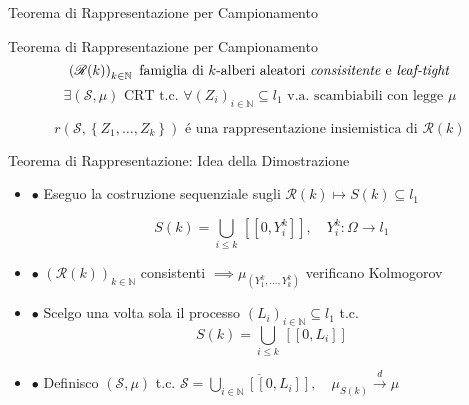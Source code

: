 \documentclass{beamer}
\theoremstyle{definition}
\theoremstyle{plain}
\theoremstyle{remark}
\begin{document}
\begin{frame}{Teorema di Rappresentazione per Campionamento}

\begin{block}{Teorema di Rappresentazione per Campionamento}
\vspace{.15cm}
$$\left(\mathscr{R}(k)\right)_{k\in\mathbb{N}}\text{ famiglia di $k$-alberi aleatori \textit{consisitente} e \textit{leaf-tight}}$$
$$\exists \left(\mathscr{S}, \mu\right)\text{ CRT t.c. }\forall \left(Z_i\right)_{i\in\mathbb{N}}\subseteq l_1 \text{  v.a. scambiabili con legge }\mu$$

$$r\left(\mathscr{S}, \left\{Z_1, \dots ,Z_k\right\}\right) \text{ \'e una rappresentazione insiemistica di } \mathscr{R}(k)$$
\vspace{.3cm}
\end{block}
\end{frame}


\begin{frame}{Teorema di Rappresentazione: Idea della Dimostrazione}
\begin{itemize}
\item $\bullet$ Eseguo la costruzione sequenziale sugli $\mathscr{R}(k)\longmapsto S(k)\subseteq l_1$

$$S(k)=\bigcup\limits_{i\leq k} \, [[0, Y^k_i]], \quad Y^k_i:\Omega\longrightarrow l_1$$
\pause
\item $\bullet$ $\left(\mathscr{R}(k)\right)_{k\in\mathbb{N}}$ consistenti $\implies \mu_{(Y^k_1, \dots ,Y^k_k)}$ verificano Kolmogorov
\bigskip
\pause
\item $\bullet$ Scelgo una volta sola il processo $(L_i)_{i\in\mathbb{N}}\subseteq l_1$ t.c. 
$$S(k)=\bigcup\limits_{i\leq k} \, [[0, L_i]]$$
\pause
\item $\bullet$ Definisco $\left(\mathscr{S}, \mu \right)$ t.c. $\mathscr{S}=\overline{\bigcup\limits_{i\in\mathbb{N}}[[0,L_i]]}, \quad \mu_{S(k)}\xrightarrow{d}\mu$
\end{itemize}

\end{frame}
\end{document}
